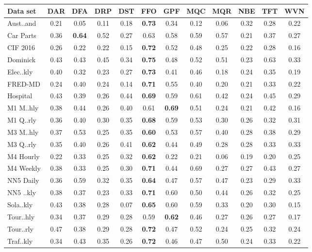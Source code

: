 
    \begin{tabular}{l|ccccccccccc}
        \toprule 
        Data set & DAR & DFA & DRP & DST & FFO & GPF & MQC & MQR & NBE & TFT & WVN \\
        \midrule
        Aust..and & 0.21 & 0.05 & 0.11 & 0.18 & \textbf{0.73} & 0.34 & 0.12 & 0.06 & 0.32 & 0.28 & 0.22 \\
        Car Parts & 0.36 & \textbf{0.64} & 0.52 & 0.27 & 0.63 & 0.58 & 0.59 & 0.57 & 0.21 & 0.37 & 0.27 \\
        CIF 2016 & 0.26 & 0.22 & 0.22 & 0.15 & \textbf{0.72} & 0.52 & 0.48 & 0.25 & 0.22 & 0.28 & 0.16 \\
        Dominick & 0.43 & 0.43 & 0.45 & 0.34 & \textbf{0.75} & 0.48 & 0.52 & 0.51 & 0.23 & 0.63 & 0.33 \\
        Elec..kly & 0.40 & 0.32 & 0.23 & 0.27 & \textbf{0.73} & 0.41 & 0.46 & 0.18 & 0.24 & 0.35 & 0.19 \\
        FRED-MD & 0.24 & 0.40 & 0.24 & 0.14 & \textbf{0.71} & 0.55 & 0.40 & 0.20 & 0.21 & 0.33 & 0.22 \\
        Hospital & 0.43 & 0.39 & 0.26 & 0.44 & \textbf{0.69} & 0.59 & 0.61 & 0.42 & 0.24 & 0.45 & 0.29 \\
        M1 M..hly & 0.38 & 0.44 & 0.26 & 0.40 & 0.61 & \textbf{0.69} & 0.51 & 0.24 & 0.21 & 0.42 & 0.16 \\
        M1 Q..rly & 0.36 & 0.40 & 0.30 & 0.35 & \textbf{0.68} & 0.59 & 0.53 & 0.30 & 0.26 & 0.32 & 0.31 \\
        M3 M..hly & 0.37 & 0.53 & 0.25 & 0.35 & \textbf{0.60} & 0.53 & 0.57 & 0.40 & 0.28 & 0.38 & 0.29 \\
        M3 Q..rly & 0.35 & 0.40 & 0.26 & 0.41 & \textbf{0.62} & 0.44 & 0.49 & 0.28 & 0.28 & 0.33 & 0.33 \\
        M4 Hourly & 0.22 & 0.33 & 0.25 & 0.32 & \textbf{0.62} & 0.22 & 0.21 & 0.06 & 0.19 & 0.20 & 0.25 \\
        M4 Weekly & 0.38 & 0.33 & 0.25 & 0.30 & \textbf{0.71} & 0.44 & 0.69 & 0.27 & 0.27 & 0.43 & 0.27 \\
        NN5 Daily & 0.36 & 0.59 & 0.32 & 0.35 & \textbf{0.64} & 0.47 & 0.57 & 0.47 & 0.23 & 0.29 & 0.33 \\
        NN5 ..kly & 0.38 & 0.37 & 0.23 & 0.33 & \textbf{0.71} & 0.60 & 0.50 & 0.44 & 0.26 & 0.32 & 0.25 \\
        Sola..kly & 0.43 & 0.38 & 0.28 & 0.07 & \textbf{0.65} & 0.60 & 0.59 & 0.33 & 0.20 & 0.30 & 0.15 \\
        Tour..hly & 0.34 & 0.37 & 0.29 & 0.28 & 0.59 & \textbf{0.62} & 0.46 & 0.27 & 0.26 & 0.27 & 0.17 \\
        Tour..rly & 0.47 & 0.38 & 0.29 & 0.28 & \textbf{0.72} & 0.47 & 0.52 & 0.24 & 0.25 & 0.32 & 0.24 \\
        Traf..kly & 0.34 & 0.43 & 0.35 & 0.26 & \textbf{0.72} & 0.46 & 0.47 & 0.50 & 0.24 & 0.33 & 0.22 \\
        \bottomrule
    \end{tabular}